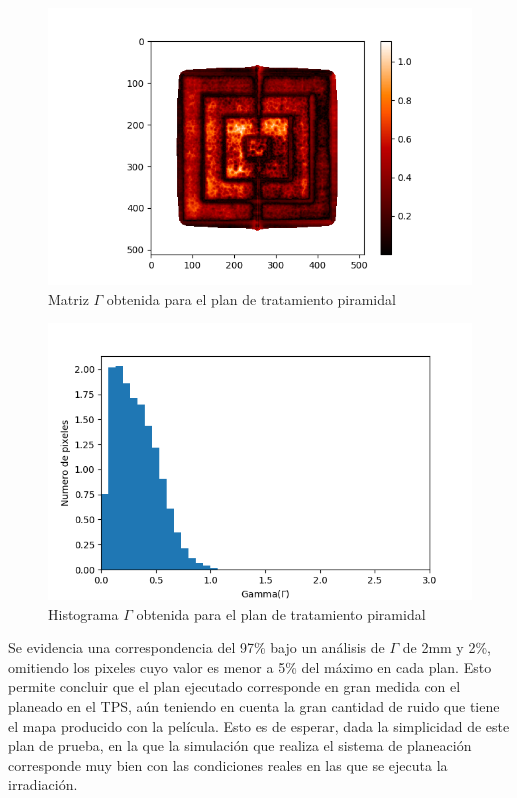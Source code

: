 \begin{figure}[H]
	\centering
	\includegraphics[width=0.9\linewidth]{images/gammaPiramideCalor.png}
	\caption{Matriz $\Gamma$ obtenida para el plan de tratamiento piramidal }
	\label{fig:matrixGAmmaPiramide}
\end{figure}
\begin{figure}[H]
	\centering
	\includegraphics[width=0.9\linewidth]{images/histogramaGammaPiramide.png}
	\caption{Histograma $\Gamma$ obtenida para el plan de tratamiento piramidal  }
	\label{fig:histogramaGAmmaPiramide}
\end{figure}

Se evidencia una correspondencia del 97\% bajo un análisis de $\Gamma$ de 2mm y 2\%, omitiendo los pixeles cuyo valor es menor a 5\% del máximo en cada plan. Esto permite concluir que el plan ejecutado corresponde en gran medida con el planeado en el TPS, aún teniendo en cuenta la gran cantidad de ruido  que tiene el mapa producido con la película. Esto es de esperar, dada la simplicidad de este plan de prueba, en la que la simulación que realiza el sistema de planeación corresponde muy bien con las condiciones reales en las que se ejecuta la irradiación.\\

